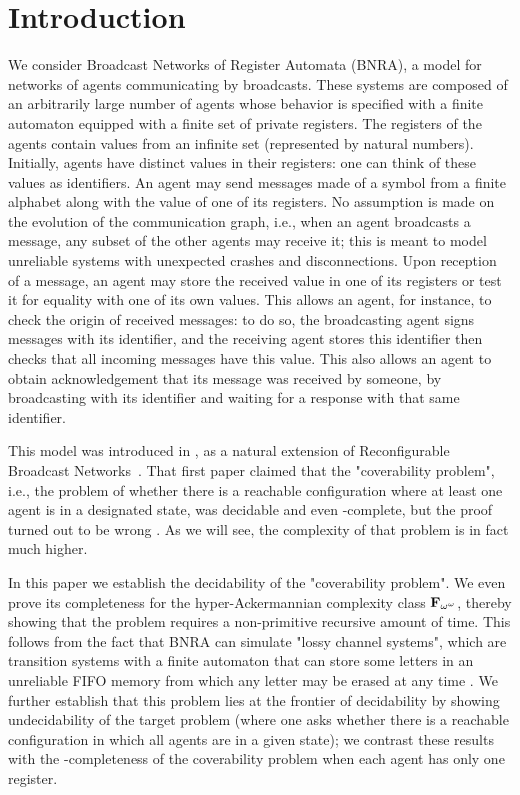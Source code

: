 \section{Introduction}

We consider Broadcast Networks of Register Automata (BNRA), a model for networks of agents communicating by broadcasts. These systems are composed of an arbitrarily large number of agents whose behavior is specified with a finite automaton equipped with a finite set of private registers. The registers of the agents contain values from an infinite set (represented by natural numbers). Initially, agents have distinct values in their registers: one can think of these values as identifiers. An agent may send messages made of a symbol from a finite alphabet along with the value of one of its registers. No assumption is made on the evolution of the communication graph, i.e., when an agent broadcasts a message, any subset of the other agents may receive it; this is meant to model unreliable systems with unexpected crashes and disconnections. Upon reception of a message, an agent may store the received value in one of its registers or test it for equality with one of its own values. 
This allows an agent, for instance, to check the origin of received messages: to do so, the broadcasting agent signs messages with its identifier, and the receiving agent stores this identifier then checks that all incoming messages have this value. This also allows an agent to obtain acknowledgement that its message was received by someone, by broadcasting with its identifier and waiting for a response with that same identifier.

This model was introduced in \cite{DelzannoST13}, as a natural extension of Reconfigurable Broadcast Networks~\cite{DelzannoSZ2010Adhoc}. That first paper claimed that the "coverability problem", i.e., the problem of whether there is a reachable configuration where at least one agent is in a designated state, was decidable and even \PSPACE-complete, but the proof turned out to be wrong \cite{ArnaudErratum}. As we will see, the complexity of that problem is in fact much higher.

In this paper we establish the decidability of the "coverability problem". We even prove its completeness for the hyper-Ackermannian complexity class $\mathbf{F}_{\omega^\omega}$, thereby showing that the problem requires a non-primitive recursive amount of time. This follows from the fact that BNRA can simulate "lossy channel systems", which are transition systems with a finite automaton that can store some letters in an unreliable FIFO memory from which any letter may be erased at any time \cite{AbdullaJ1996verif, Schnoebelen2002verifying,ChambartS08ordinal}. 
We further establish that this problem lies at the frontier of decidability by showing undecidability of the target problem (where one asks whether there is a reachable configuration in which all agents are in a given state); we contrast these results with the \NP-completeness of the coverability problem when each agent has only one register. 

